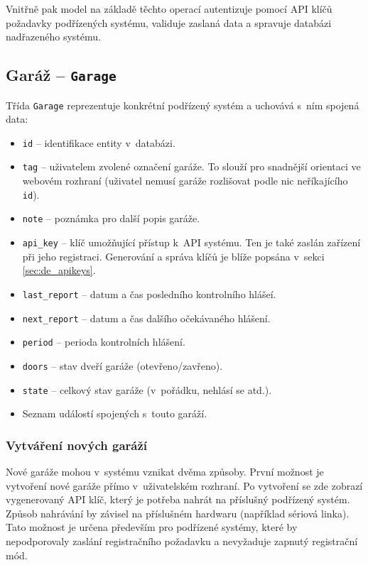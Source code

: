 Vnitřně pak model na základě těchto operací autentizuje pomocí API klíčů požadavky podřízených systému, validuje zaslaná data a spravuje databázi nadřazeného systému.

\subsection{Garáž -- \texttt{Garage}}

Třída \texttt{Garage} reprezentuje konkrétní podřízený systém a uchovává s~ním spojená data:

\begin{itemize}
    \item \texttt{id} -- identifikace entity v~databázi.
    \item \texttt{tag} -- uživatelem zvolené označení garáže. To slouží pro snadnější orientaci ve webovém rozhraní (uživatel nemusí garáže rozlišovat podle nic neříkajícího \texttt{id}).
    \item \texttt{note} -- poznámka pro další popis garáže.
    \item \texttt{api\_key} -- klíč umožňující přístup k~API systému. Ten je také zaslán zařízení při jeho registraci. Generování a správa klíčů je blíže popsána v~sekci \ref{sec:de_apikeys}.
    \item \texttt{last\_report} -- datum a čas posledního kontrolního hlášeí.
    \item \texttt{next\_report} -- datum a čas dalšího očekávaného hlášení.
    \item \texttt{period} -- perioda kontrolních hlášení.
    \item \texttt{doors} -- stav dveří garáže (otevřeno/zavřeno).
    \item \texttt{state} -- celkový stav garáže (v~pořádku, nehlásí se atd.).
    \item Seznam událostí spojených s~touto garáží.
\end{itemize}

\subsubsection{Vytváření nových garáží}
\label{sec:de_add_garage}

Nové garáže mohou v~systému vznikat dvěma způsoby. První možnost je vytvoření nové garáže přímo v~uživatelském rozhraní. Po vytvoření se zde zobrazí vygenerovaný API klíč, který je potřeba nahrát na příslušný podřízený systém. Způsob nahrávání by závisel na příslušném hardwaru (například sériová linka). Tato možnost je určena především pro podřízené systémy, které by nepodporovaly zaslání registračního požadavku a nevyžaduje zapnutý registrační mód.


